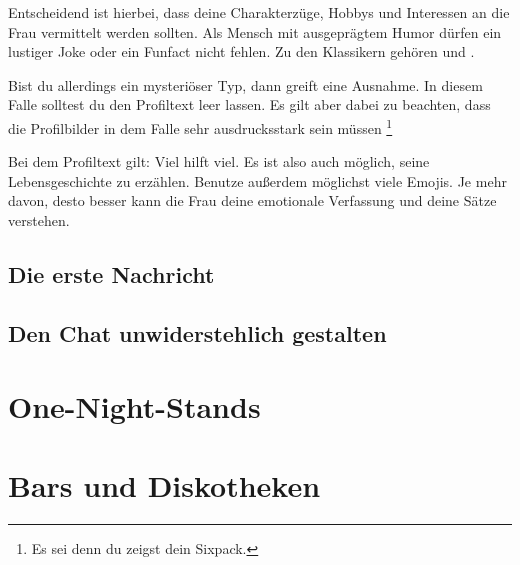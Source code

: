 Entscheidend ist hierbei, dass deine Charakterzüge, Hobbys und Interessen an die Frau vermittelt werden sollten.
Als Mensch mit ausgeprägtem Humor dürfen ein lustiger Joke oder ein Funfact nicht fehlen.
Zu den Klassikern gehören \glqq \grqq und \glqq \grqq.

Bist du allerdings ein mysteriöser Typ, dann greift eine Ausnahme.
In diesem Falle solltest du den Profiltext leer lassen.
Es gilt aber dabei zu beachten, dass die Profilbilder in dem Falle sehr ausdrucksstark sein müssen \footnote{Es sei denn du zeigst dein Sixpack.} 

Bei dem Profiltext gilt: Viel hilft viel. 
Es ist also auch möglich, seine Lebensgeschichte zu erzählen.
Benutze außerdem möglichst viele Emojis.
Je mehr davon, desto besser kann die Frau deine emotionale Verfassung und deine Sätze verstehen.




%




\subsection{Die erste Nachricht}



\subsection{Den Chat unwiderstehlich gestalten}





\section{One-Night-Stands}





\section{Bars und Diskotheken}





